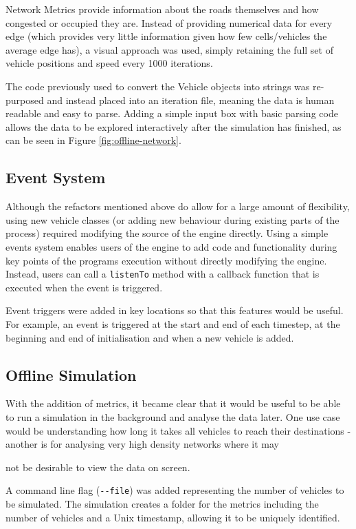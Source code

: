 \documentclass[ %
                    author={Alexander Hill},
                supervisor={Dr. Benjamin Sach},
                    degree={MEng},
                     title={MARMOSET},
                  subtitle={Multi-Agent Route Management using Online Simulation for Efficient Transportation},
                      type={research},
                      year={2016} ]{dissertation}
\begin{document}
Network Metrics provide information about the roads themselves and how congested
or occupied they are. Instead of providing numerical data for every edge (which
provides very little information given how few cells/vehicles the average edge
has), a visual approach was used, simply retaining the full set of vehicle
positions and speed every 1000 iterations.

The code previously used to convert the Vehicle objects into strings was
re-purposed and instead placed into an iteration file, meaning the data is human
readable and easy to parse. Adding a simple input box with basic parsing code
allows the data to be explored interactively after the simulation has finished,
as can be seen in Figure \ref{fig:offline-network}.

\subsection{Event System}

Although the refactors mentioned above do allow for a large amount of
flexibility, using new vehicle classes (or adding new behaviour during existing
parts of the process) required modifying the source of the engine directly.
Using a simple events system enables users of the engine to add code and
functionality during key points of the programs execution without directly
modifying the engine. Instead, users can call a \texttt{listenTo} method with a
callback function that is executed when the event is triggered.

Event triggers were added in key locations so that this features would be
useful. For example, an event is triggered at the start and end of each
timestep, at the beginning and end of initialisation and when a new vehicle is
added.

\subsection{Offline Simulation}

With the addition of metrics, it became clear that it would be useful to be able
to run a simulation in the background and analyse the data later. One use case
would be understanding how long it takes all vehicles to reach their
destinations - another is for analysing very high density networks where it may

not be desirable to view the data on screen.

A command line flag (\texttt{-{}-file}) was added representing the number of
vehicles to be simulated. The simulation creates a folder for the metrics
including the number of vehicles and a Unix timestamp, allowing it to be
uniquely identified.
\end{document}
